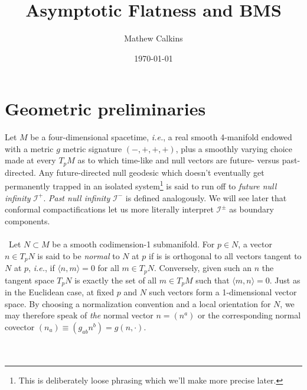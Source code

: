 \documentclass[11pt,letterpaper]{article}
\newcommand{\mc}[1]{\mathcal{#1}}
\begin{document}
\title{Asymptotic Flatness and BMS}

\author{Mathew Calkins}

\date{\today}

 
\maketitle


\tableofcontents

\section{Geometric preliminaries}
Let $M$ be a four-dimensional spacetime, \textit{i.e.}, a real smooth 4-manifold endowed with a metric $g$ metric signature $(-,+,+,+)$, plus a smoothly varying choice made at every $T_p M$ as to which time-like and null vectors are future- versus past-directed. Any future-directed null geodesic which doesn't eventually get permanently trapped in an isolated system\footnote{This is deliberately loose phrasing which we'll make more precise later.} is said to run off to \textit{future null infinity} $\mc{I}^+$. \textit{Past null infinity} $\mc{I}^-$ is defined analogously. We will see later that conformal compactifications let us more literally interpret $\mc{I}^\pm$ as boundary components.\\
\\
\
Let $N \subset M$ be a smooth codimension-1 submanifold. For $p \in N$, a vector $n \in T_p N$ is said to be \textit{normal} to $N$ at $p$ if is is orthogonal to all vectors tangent to $N$ at $p$, \textit{i.e.}, if $\langle n, m \rangle = 0$ for all $m \in T_p N$. Conversely, given such an $n$ the tangent space $T_p N$ is exactly the set of all $m \in T_p M$ such that $\langle m, n \rangle = 0$. Just as in the Euclidean case, at fixed $p$ and $N$ such vectors form a 1-dimensional vector space. By choosing a normalization convention and a local orientation for $N$, we may therefore speak of \textit{the} normal vector $n = (n^a)$ or the corresponding normal covector $(n_a) \equiv (g_{ab} n^b) = g(n, \cdot)$. \\
\\
\
\end{document}
